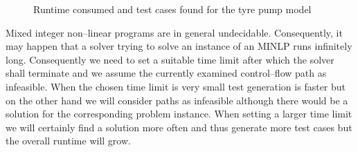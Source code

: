 \documentclass[runningheads,a4paper]{llncs}%
\begin{document}
\begin{figure}
%
\caption{Runtime consumed and test cases found for the tyre pump model%
}%
\label{fig:ExplodingTyresRuntime}%
\end{figure}%
Mixed integer non--linear programs are in general undecidable. Consequently, it may happen that a solver trying to solve an instance of an MINLP runs infinitely long. Consequently we need to set a suitable time limit after which the solver shall terminate and we assume the currently examined control--flow path as infeasible. When the chosen time limit is very small test generation is faster but on the other hand we will consider %
paths as infeasible although there would be a solution for the corresponding problem instance. When setting a larger time limit we will certainly find a solution more often and thus generate more test cases but the overall runtime will grow.
\end{document}
